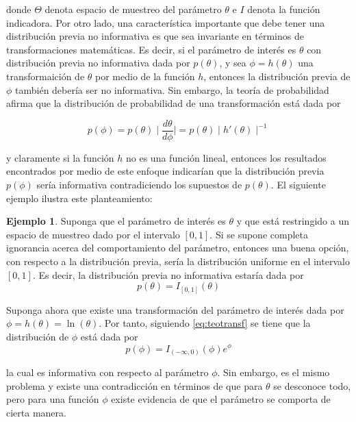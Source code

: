 \documentclass[
  spanish,
]{book}
\theoremstyle{definition}
\theoremstyle{definition}
\newtheorem{example}{Ejemplo}[chapter]
\theoremstyle{definition}
\theoremstyle{remark}
\begin{document}
donde \(\Theta\) denota espacio de muestreo del parámetro \(\theta\) e \(I\)
denota la función indicadora. Por otro lado, una característica
importante que debe tener una distribución previa no informativa
es que sea invariante en términos de transformaciones matemáticas. Es
decir, si el parámetro de interés es \(\theta\) con distribución
previa no informativa dada por \(p(\theta)\), y sea
\(\phi=h(\theta)\) una transformaición de \(\theta\) por medio de la función
\(h\), entonces la distribución previa de \(\phi\) también debería
ser no informativa. Sin embargo, la teoría de probabilidad afirma que la
distribución de probabilidad de una transformación está dada por

\begin{equation}
\label{eq:teotransf}
p(\phi)=p(\theta) \mid \frac{d\theta}{d\phi} \mid =p(\theta) \mid h'(\theta) \mid ^{-1}
\end{equation}

y claramente si la función \(h\) no es una función lineal, entonces los
resultados encontrados por medio de este enfoque indicarían que la
distribución previa \(p(\phi)\) sería informativa contradiciendo
los supuestos de \(p(\theta)\). El siguiente ejemplo ilustra este
planteamiento:

\begin{example}
\protect\hypertarget{exm:unnamed-chunk-15}{}{\label{exm:unnamed-chunk-15} }Suponga que el parámetro de interés es \(\theta\) y que está restringido a un espacio de muestreo dado por el intervalo \([0,1]\). Si se supone completa ignorancia acerca del comportamiento del parámetro, entonces una buena opción, con respecto a la distribución previa, sería la distribución uniforme en el intervalo \([0,1]\). Es decir, la distribución previa no informativa estaría dada por
\begin{equation*}
p(\theta) = I_{[0,1]}(\theta)
\end{equation*}

Suponga ahora que existe una transformación del parámetro de interés dada por \(\phi=h(\theta)=\ln(\theta)\). Por tanto, siguiendo \eqref{eq:teotransf} se tiene que la distribución de \(\phi\) está dada por
\begin{equation*}
p(\phi)=I_{(-\infty,0)}(\phi)e^{\phi}
\end{equation*}

la cual es informativa con respecto al parámetro \(\phi\). Sin embargo, es el mismo problema y existe una contradicción en términos de que para \(\theta\) se desconoce todo, pero para una función \(\phi\) existe evidencia de que el parámetro se comporta de cierta manera.
\end{example}
\end{document}
